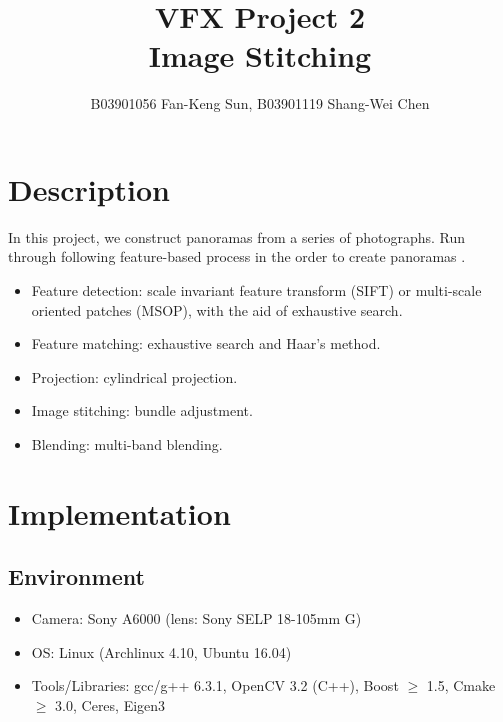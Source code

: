 \documentclass[11pt]{article}
\title{\bf{VFX Project 2\\\large{Image Stitching}}\vspace{-10pt}}
\author{B03901056 Fan-Keng Sun, B03901119 Shang-Wei Chen}
\date{}
\begin{document}
\maketitle
\section{Description}
In this project, we construct panoramas from a series of photographs. Run through following feature-based process in the order to create panoramas \cite{ref:panorama0} \cite{ref:panorama1}.
\begin{itemize}
  \itemsep=0pt
  \item Feature detection: scale invariant feature transform (SIFT) or multi-scale oriented patches (MSOP), with the aid of exhaustive search.
  \item Feature matching: exhaustive search and Haar's method.
  \item Projection: cylindrical projection.
  \item Image stitching: bundle adjustment.
  \item Blending: multi-band blending.
\end{itemize}
\section{Implementation}
\subsection{Environment}
\begin{itemize}
  \itemsep=0pt
  \item Camera: Sony A6000 (lens: Sony SELP 18-105mm G)
  \item OS: Linux (Archlinux 4.10, Ubuntu 16.04)
  \item Tools/Libraries: gcc/g++ 6.3.1, OpenCV 3.2 (C++), Boost $\geq$ 1.5, Cmake $\geq$ 3.0, Ceres, Eigen3
\end{itemize}
\end{document}
